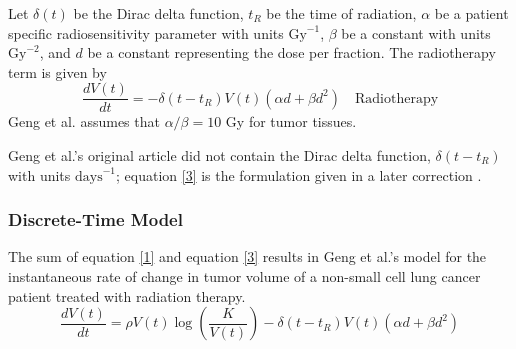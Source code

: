 \documentclass[letterpaper
, superscriptaddress
, twocolumn
, aps
]{revtex4}
\begin{document}
Let $\delta(t)$ be the Dirac delta function, $t_{R}$ be the time of radiation, $\alpha$ be a patient specific radiosensitivity parameter with units $\text{Gy}^{-1}$, $\beta$ be a constant with units $\text{Gy}^{-2}$, and $d$ be a constant representing the dose per fraction. The radiotherapy term is given by
\begin{equation} \label{3}
\frac{dV(t)}{dt} = - \delta(t - t_{R}) V(t)(\alpha d + \beta d^{2}) \quad \text{Radiotherapy}
\end{equation}
Geng et al. assumes that $\alpha / \beta = 10$ Gy for tumor tissues. 

%

Geng et al.'s original article did not contain the Dirac delta function, $\delta(t - t_{R})$ with units $\text{days}^{-1}$; equation \eqref{3} is the formulation given in a later correction \cite{Changran2018}. 

\subsubsection{Discrete-Time Model}

The sum of equation \eqref{1} and equation \eqref{3} results in Geng et al.'s model for the instantaneous rate of change in tumor volume of a non-small cell lung cancer patient treated with radiation therapy. 
\begin{equation}\label{4}
\frac{dV(t)}{dt} = \rho V(t) \log \left(\frac{K}{V(t)}\right) - \delta(t - t_{R}) V(t) (\alpha d + \beta d^{2})
\end{equation}
\end{document}
